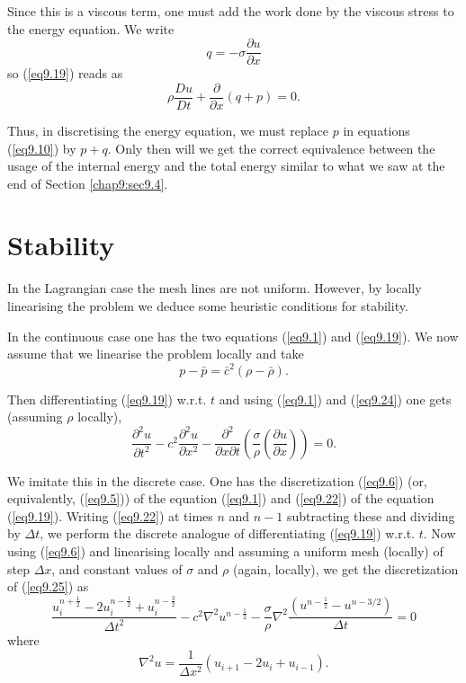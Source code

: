Since this is a viscous term, one must add the work done by the viscous stress to the energy equation. We write 
$$
q = -\sigma \frac{\partial u}{\partial x}
$$\pageoriginale
so (\ref{eq9.19}) reads as 
\begin{equation*}
\rho \frac{D u}{Dt} + \frac{\partial }{\partial x} (q+p) = 0. 
\tag{9.23}\label{eq9.23}
\end{equation*}

Thus, in discretising the energy equation, we must replace $p$ in
equations (\ref{eq9.10}) by $p+q$. Only then will we get the correct
equivalence between the usage of the internal energy and the total
energy similar to what we saw at the end of Section
\ref{chap9:sec9.4}. 

\section{Stability}\label{chap9:sec9.6}

In the Lagrangian case the mesh lines are not uniform. However, by locally linearising the problem we deduce some heuristic conditions for stability.

In the continuous case one has the two equations (\ref{eq9.1}) and (\ref{eq9.19}). We now assume that we linearise the problem locally and take 
\begin{equation*}
p - \bar{p} = \bar{c}^2 (\rho - \bar{\rho}). 
\tag{9.24}\label{eq9.24}
\end{equation*}

Then differentiating (\ref{eq9.19}) w.r.t. $t$ and using (\ref{eq9.1}) and (\ref{eq9.24}) one gets (assuming $\rho$ locally),
\begin{equation*}
\frac{\partial^2 u}{\partial t^2} - c^2 \frac{\partial^2 u}{\partial x^2} - \frac{\partial^2 }{\partial x \partial t} (\frac{\sigma}{\rho} (\frac{\partial u}{\partial x})) =0.\tag{9.25}\label{eq9.25}
\end{equation*}

We imitate this in the discrete case. One has the discretization (\ref{eq9.6}) (or, equivalently, (\ref{eq9.5})) of the equation (\ref{eq9.1}) and (\ref{eq9.22}) of the equation (\ref{eq9.19}). Writing (\ref{eq9.22}) at times $n$ and $n-1$ subtracting these and dividing by $\Delta t$, we perform the discrete analogue of differentiating (\ref{eq9.19}) w.r.t. $t$. Now using (\ref{eq9.6}) and linearising locally and assuming a uniform mesh (locally) of step $\Delta x$, and constant values of $\sigma$ and $\rho$ (again, locally), we get the discretization of (\ref{eq9.25}) as 
\begin{equation*}
\frac{u^{n+\frac{1}{2}}_i - 2u^{n-\frac{1}{2}}_i + u^{n-\frac{3}{2}}_i }{\Delta t^2} - c^2 \nabla^2 u^{n-\frac{1}{2}} - \frac{\sigma}{\rho} \nabla^2  \frac{(u^{n-\frac{1}{2}} - u^{n-3/2})}{\Delta t} = 0\tag{9.26} \label{eq9.26}
\end{equation*}\pageoriginale
where 
\begin{equation*}
\nabla^2 u = \frac{1}{\Delta x^2} (u_{i+1} - 2u_i + u_{i-1}).\tag{9.27}\label{eq9.27}
\end{equation*}

